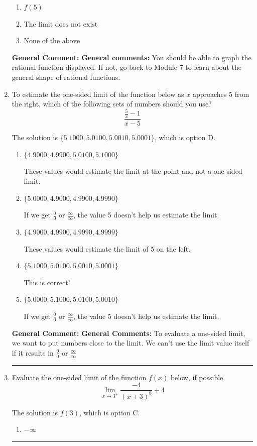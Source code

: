 \documentclass{extbook}[14pt]
\newcommand{\litem}[1]{\item #1

\rule{\textwidth}{0.4pt}}
\begin{document}
\begin{enumerate}
{\begin{enumerate}[label=\Alph*.]
\item \( f(5) \)


\item \( \text{The limit does not exist} \)


\item \( \text{None of the above} \)


\end{enumerate}

\textbf{General Comment:} \textbf{General comments:} You should be able to graph the rational function displayed. If not, go back to Module 7 to learn about the general shape of rational functions.
}
\litem{
To estimate the one-sided limit of the function below as $x$ approaches 5 from the right, which of the following sets of numbers should you use?
\[ \frac{\frac{5}{x} - 1}{x - 5} \]

The solution is \( \{ 5.1000, 5.0100, 5.0010, 5.0001 \} \), which is option D.\begin{enumerate}[label=\Alph*.]
\item \( \{ 4.9000, 4.9900, 5.0100, 5.1000 \} \)

These values would estimate the limit at the point and not a one-sided limit.
\item \( \{ 5.0000, 4.9000, 4.9900, 4.9990 \} \)

If we get $\frac{0}{0}$ or $\frac{\infty}{\infty}$, the value 5 doesn't help us estimate the limit.
\item \( \{ 4.9000, 4.9900, 4.9990, 4.9999 \} \)

These values would estimate the limit of 5 on the left.
\item \( \{ 5.1000, 5.0100, 5.0010, 5.0001 \} \)

This is correct!
\item \( \{ 5.0000, 5.1000, 5.0100, 5.0010 \} \)

If we get $\frac{0}{0}$ or $\frac{\infty}{\infty}$, the value 5 doesn't help us estimate the limit.
\end{enumerate}

\textbf{General Comment:} \textbf{General Comments:} To evaluate a one-sided limit, we want to put numbers close to the limit. We can't use the limit value itself if it results in $\frac{0}{0}$ or $\frac{\infty}{\infty}$
}
\litem{
Evaluate the one-sided limit of the function $f(x)$ below, if possible.
\[ \lim_{x \rightarrow 3^+} \frac{-4}{(x+3)^8}+4 \]

The solution is \( f(3) \), which is option C.\begin{enumerate}[label=\Alph*.]
\item \( -\infty \)



\end{enumerate}}
\end{enumerate}
\end{document}
